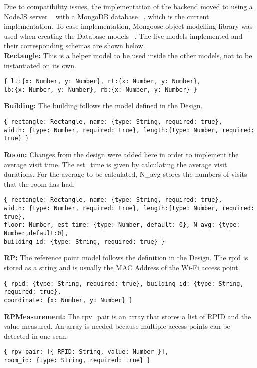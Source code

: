 Due to compatibility issues, the implementation of the backend moved to using a NodeJS server ~\cite{NodeJS} with a MongoDB database ~\cite{MongoDB}, which is the current implementation.
To ease implementation, Mongoose object modelling library was used when creating the Database models ~\cite{Mongoose}. The five models implemented and their corresponding schemas are shown below. 
\\
\textbf{Rectangle:}
This is a helper model to be used inside the other models, not to be instantiated on its own.
\begin{lstlisting}
{ lt:{x: Number, y: Number}, rt:{x: Number, y: Number}, 
lb:{x: Number, y: Number}, rb:{x: Number, y: Number} }	
\end{lstlisting}

\noindent
\textbf{Building:}
The building follows the model defined in the Design. 
\begin{lstlisting}
{ rectangle: Rectangle, name: {type: String, required: true},
width: {type: Number, required: true}, length:{type: Number, required: true} }
\end{lstlisting}

\noindent
\textbf{Room:}
Changes from the design were added here in order to implement the average visit time. The est\_time is given by calculating the average visit durations. For the average to be calculated, N\_avg stores the numbers of visits that the room has had.
\begin{lstlisting}
{ rectangle: Rectangle, name: {type: String, required: true},
width: {type: Number, required: true}, length:{type: Number, required: true},
floor: Number, est_time: {type: Number, default: 0}, N_avg: {type: Number,default:0},
building_id: {type: String, required: true} }
\end{lstlisting}

\noindent
\textbf{RP:}
The reference point model follows the definition in the Design. The rpid is stored as a string and is usually the MAC Address of the Wi-Fi access point.
\begin{lstlisting}
{ rpid: {type: String, required: true}, building_id: {type: String, required: true},
coordinate: {x: Number, y: Number} }
\end{lstlisting}

\noindent
\textbf{RPMeasurement:}
The rpv\_pair is an array that stores a list of RPID and the value measured. An array is needed because multiple access points can be detected in one scan. 
\begin{lstlisting}
{ rpv_pair: [{ RPID: String, value: Number }], 
room_id: {type: String, required: true} }
\end{lstlisting}

